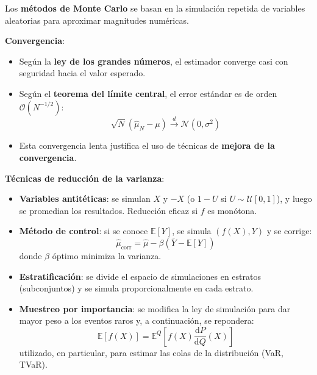 \begin{f}
	
	Los \textbf{métodos de Monte Carlo} se basan en la simulación repetida de variables aleatorias para aproximar magnitudes numéricas.
	
	\textbf{Convergencia}:
	\begin{itemize}[nosep]
		\item Según la \textbf{ley de los grandes números}, el estimador converge casi con seguridad hacia el valor esperado.
		\item Según el \textbf{teorema del límite central}, el error estándar es de orden \(\mathcal{O}(N^{-1/2})\):
		\[
		\sqrt{N}(\hat{\mu}_N - \mu) \xrightarrow{d} \mathcal{N}(0, \sigma^2)
		\]
		\item Esta convergencia lenta justifica el uso de técnicas de \textbf{mejora de la convergencia}.
	\end{itemize}
	
	\textbf{Técnicas de reducción de la varianza}:
	\begin{itemize}
		\item \textbf{Variables antitéticas}: se simulan \(X\) y \(-X\) (o \(1-U\) si \(U \sim \mathcal{U}[0,1]\)), y luego se promedian los resultados. Reducción eficaz si \(f\) es monótona.
		\item \textbf{Método de control}: si se conoce \(\mathbb{E}[Y]\), se simula \((f(X), Y)\) y se corrige:
		\[
		\hat{\mu}_\text{corr} = \hat{\mu} - \beta(\bar{Y} - \mathbb{E}[Y])
		\]
		donde \(\beta\) óptimo minimiza la varianza.
		\item \textbf{Estratificación}: se divide el espacio de simulaciones en estratos (subconjuntos) y se simula proporcionalmente en cada estrato.
		\item \textbf{Muestreo por importancia}: se modifica la ley de simulación para dar mayor peso a los eventos raros y, a continuación, se repondera:
		\[
		\mathbb{E}[f(X)] = \mathbb{E}^{Q}\left[f(X) \frac{\mathrm{d}P}{\mathrm{d}Q}(X)\right]
		\]
		utilizado, en particular, para estimar las colas de la distribución (VaR, TVaR).
\end{itemize}

\end{f}
